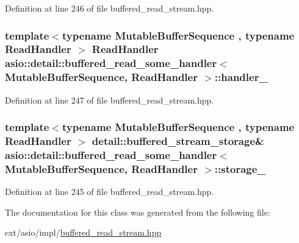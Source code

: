 Definition at line 246 of file buffered\+\_\+read\+\_\+stream.\+hpp.

\hypertarget{classasio_1_1detail_1_1buffered__read__some__handler_aea902699b5dbf6b5ef4abb29a555cdf7}{}
\subsubsection[{handler\+\_\+}]{\setlength{\rightskip}{0pt plus 5cm}template$<$typename Mutable\+Buffer\+Sequence , typename Read\+Handler $>$ Read\+Handler {\bf asio\+::detail\+::buffered\+\_\+read\+\_\+some\+\_\+handler}$<$ Mutable\+Buffer\+Sequence, Read\+Handler $>$\+::handler\+\_\+}\label{classasio_1_1detail_1_1buffered__read__some__handler_aea902699b5dbf6b5ef4abb29a555cdf7}


Definition at line 247 of file buffered\+\_\+read\+\_\+stream.\+hpp.

\hypertarget{classasio_1_1detail_1_1buffered__read__some__handler_ae516ae4c7472244010db6e7216e2793a}{}
\subsubsection[{storage\+\_\+}]{\setlength{\rightskip}{0pt plus 5cm}template$<$typename Mutable\+Buffer\+Sequence , typename Read\+Handler $>$ {\bf detail\+::buffered\+\_\+stream\+\_\+storage}\& {\bf asio\+::detail\+::buffered\+\_\+read\+\_\+some\+\_\+handler}$<$ Mutable\+Buffer\+Sequence, Read\+Handler $>$\+::storage\+\_\+}\label{classasio_1_1detail_1_1buffered__read__some__handler_ae516ae4c7472244010db6e7216e2793a}


Definition at line 245 of file buffered\+\_\+read\+\_\+stream.\+hpp.



The documentation for this class was generated from the following file\+:\begin{DoxyCompactItemize}
\item 
ext/asio/impl/\hyperlink{impl_2buffered__read__stream_8hpp}{buffered\+\_\+read\+\_\+stream.\+hpp}\end{DoxyCompactItemize}
